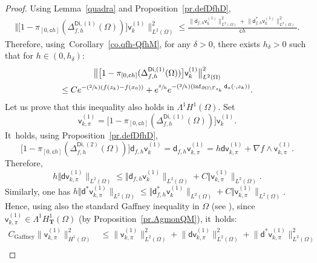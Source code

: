 \documentclass[10pt]{amsart}
\newcommand{\Psfrac}[2]{(\sfrac{#1}{#2})}
\newcommand{\mbf}[1]{\mathbf{#1}}
\theoremstyle{plain}
\theoremstyle{definition}
\begin{document}
\begin{proof}
Using Lemma~\ref{quadra} and Proposition~\ref{pr.defDfhD},\vspace*{-3pt}
\begin{align*}
\big \Vert \big[1-\pi_{[0,\mathsf ch]} (\Delta_{f,h}^{\mathsf{Di},(1)} (\Omega)) \big] \mathsf v_k^{(1)} \big \|^{2}_{ L^{2} (\Omega)} \le \frac{ \big \| \mathsf d_{f,h} \mathsf v_k^{(1)} \big \|^{2}_{ L^{2} (\Omega)}+
\big \| \mathsf d^{*}_{f,h} \mathsf v_k^{(1)} \big \|^{2}_{ L^{2} (\Omega)}}{\mathsf ch}.
\end{align*}
Therefore, using~Corollary~\ref{co.qfh-QfhM}, for any $\delta>0$,
there exists $h_\delta>0$ such that for $h\in (0,h_\delta)$:\vspace*{-5pt}
\begin{multline*}
\big \Vert \big[1-\pi_{[0,\mathsf ch]} (\Delta_{f,h}^{\mathsf{Di},(1)} (\Omega)) \big] \mathsf v_k^{(1)} \big \|^{2}_{ L^{2} (\Omega)}\\
\le C e^{-\Psfrac 2h(f(z_k)-f(x_0))}+e^{\sfrac{ \delta }{h}} e^{-\Psfrac 2h(\inf_{ \partial \Omega \setminus \Gamma_{z_k}} \mathsf d_a(\cdot,z_k))}.
\end{multline*}
Let us prove that this inequality also holds in $\Lambda^1H^1(\Omega)$.
Set
\[
\mathsf v_{k,\pi}^{(1)}=\big[1-\pi_{[0,\mathsf ch]} (\Delta_{f,h}^{\mathsf{Di},(1)} (\Omega)) \big] \mathsf v_k^{(1)}.
\]
It~holds, using Proposition~\ref{pr.defDfhD},
\[
\big[1-\pi_{[0,\mathsf ch]} (\Delta_{f,h}^{\mathsf{Di},(2)} (\Omega)) \big]\mathsf d_{f,h} \mathsf v_k^{(1)} = \mathsf d_{f,h}\mathsf v_{k,\pi}^{(1)}=h\mathsf d \mathsf v_{k,\pi}^{(1)} +\nabla f\wedge \mathsf v_{k,\pi}^{(1)}.
\]
Therefore,
\[
h \Vert \mathsf d \mathsf v_{k,\pi}^{(1)} \|_{ L^{2} (\Omega)} \le \Vert \mathsf d_{f,h} \mathsf v_k^{(1)} \|_{ L^{2} (\Omega)} + C\Vert \mathsf v_{k,\pi}^{(1)} \|_{ L^{2} (\Omega)}.
\]
Similarly, one has $h \Vert \mathsf d^* \mathsf v_{k,\pi}^{(1)} \|_{ L^{2} (\Omega)} \le \Vert \mathsf d^*_{f,h} \mathsf v_k^{(1)} \|_{ L^{2} (\Omega)} + C\Vert \mathsf v_{k,\pi}^{(1)} \|_{ L^{2} (\Omega)}$.
Hence, using also the standard Gaffney inequality in $\Omega$ (see \cite{GSchw}), since $\mathsf v_{k,\pi}^{(1)}\in \Lambda^1H^1_{\mbf T}(\Omega)$ (by Proposition~\ref{pr.AgmonQM}), it~holds:
\begin{align}
\nonumber
C_{\text{Gaffney}}\big \| \mathsf v_{k,\pi}^{(1)} \big \|^{2}_{ H^1 (\Omega)}&\le \big \| \mathsf v_{k,\pi}^{(1)} \big \|^{2}_{ L^{2} (\Omega)} + \big \| \mathsf d \mathsf v_{k,\pi}^{(1)} \big \|^{2}_{ L^{2} (\Omega)}+
\big \| \mathsf d^{*} \mathsf v_{k,\pi}^{(1)} \big \|^{2}_{ L^{2} (\Omega)}\\

\end{align}
\end{proof}
\end{document}
